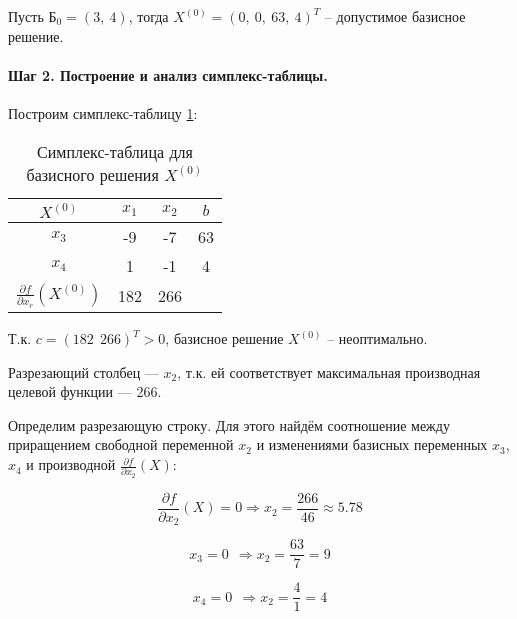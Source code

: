 Пусть $\text{Б}_0 = (3,\ 4)$, тогда $X^{(0)} = (0,\ 0,\ 63,\ 4)^T$ -- допустимое базисное решение.

\paragraph{Шаг 2. Построение и анализ симплекс-таблицы.}

Построим симплекс-таблицу \ref{tab:simpl:1}:

\begin{table}[H]
\begin{center}
	\caption{Симплекс-таблица для базисного решения $X^{(0)}$}
	\label{tab:simpl:1}
	\def\tabcolsep{18pt}
	\def\arraystretch{1.5}
	\fontsize{13}{14}\selectfont
	\begin{tabular}{|c|c||c||c|}
		\hline 
		$X^{(0)}$ & $x_1$ & $x_2$ & $b$ \\ 
		\hline 
		$x_3$ & -9 & -7 & 63 \\ 
		\hhline{|=|=#=#=|}
		$x_4$ & 1 & \cellcolor{pink} -1 & 4 \\ 
		\hhline{|=|=#=#=|}
		$\frac{\partial f}{\partial x_r} \left(X^{(0)} \right)$ & 182 & 266 &  \\ 
		\hline 
	\end{tabular} 
\end{center}
\end{table}

Т.к. $c = (182\ \ 266)^T > 0$, базисное решение $X^{(0)}$ -- неоптимально.

Разрезающий столбец --- $x_2$, т.к. ей соответствует максимальная производная целевой функции --- 266.

Определим разрезающую строку. Для этого найдём соотношение между приращением свободной переменной $x_2$ и изменениями базисных переменных $x_3$, $x_4$ и производной $\frac{\partial f}{\partial x_2} \left(X \right)$:

\begin{equation*}
	\frac{\partial f}{\partial x_2} \left(X \right) = 0 \Rightarrow x_2 = \frac{266}{46} \approx 5.78
\end{equation*}

\begin{equation*}
	x_3 = 0\ \ \Rightarrow x_2 = \frac{63}{7} = 9
\end{equation*}

\begin{equation*}
	x_4 = 0\ \ \Rightarrow x_2 = \frac{4}{1} = 4
\end{equation*}

